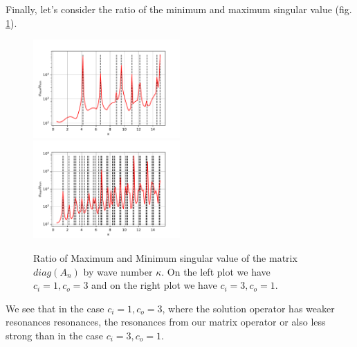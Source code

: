 \documentclass[10pt,journal,compsoc, onecolumn]{IEEEtran}
\begin{document}
Finally, let's consider the ratio of the minimum and maximum singular value (fig. \ref{fig:ratio_sing_val}).
\begin{figure}
    \includegraphics[width=0.5\textwidth]{scenario1Ratio.pdf}
    \includegraphics[width=0.5\textwidth]{scenario2Ratio.pdf}
    \caption{Ratio of Maximum and Minimum singular value of the matrix $diag(A_n)$ by wave number $\kappa$. 
    On the left plot we have $c_i = 1, c_o = 3$ 
    and on the right plot we have $c_i = 3, c_o = 1.$ }
   \label{fig:ratio_sing_val}
\end{figure}
We see that in the case $c_i = 1, c_o =3$, where the solution operator has weaker resonances resonances, 
the resonances from our matrix operator or also less strong 
than in the case $c_i = 3, c_o =1$.


%
%
%
\end{document}
